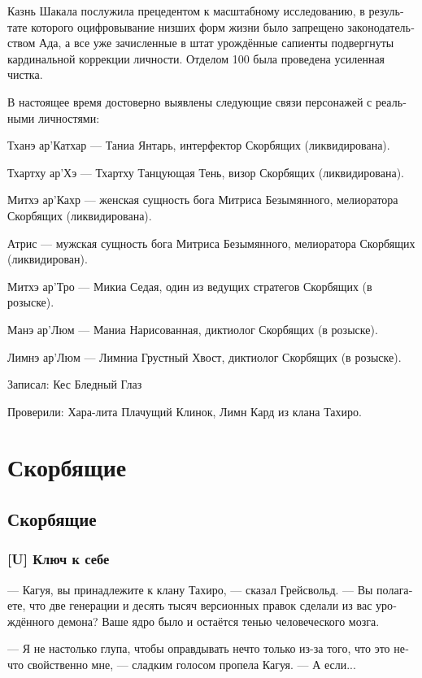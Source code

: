 \documentclass[a4paper,12pt,fleqn]{book}\usepackage{cooltooltips}\usepackage{polyglossia}\setdefaultlanguage[babelshorthands=true]{russian}\setotherlanguage{english}\defaultfontfeatures{Ligatures=TeX,Mapping=tex-text} \usepackage{xcolor}\definecolor{lightgray}{HTML}{bbbbbb}\color{lightgray}\newcommand{\ml}[3]{\textenglish{\textcolor{black}{#3}}}
\newcommand{\textspace}{\vspace{1em}{\centering\Large\bfseries<...>\par}\vspace{1em}}
\begin{document}
Казнь Шакала послужила прецедентом к масштабному исследованию, в результате которого оцифровывание низших форм жизни было запрещено законодательством Ада, а все уже зачисленные в штат урождённые сапиенты подвергнуты кардинальной коррекции личности.
Отделом 100 была проведена усиленная чистка.

В настоящее время достоверно выявлены следующие связи персонажей с реальными личностями:

Тханэ ар'Катхар --- Таниа Янтарь, интерфектор Скорбящих (ликвидирована).

Тхартху ар'Хэ --- Тхартху Танцующая Тень, визор Скорбящих (ликвидирована).

Митхэ ар'Кахр --- женская сущность бога Митриса Безымянного, мелиоратора Скорбящих (ликвидирована).

Атрис --- мужская сущность бога Митриса Безымянного, мелиоратора Скорбящих (ликвидирован).

Митхэ ар'Тро --- Микиа Седая, один из ведущих стратегов Скорбящих (в розыске).

Манэ ар'Люм --- Маниа Нарисованная, диктиолог Скорбящих (в розыске).

Лимнэ ар'Люм --- Лимниа Грустный Хвост, диктиолог Скорбящих (в розыске).

Записал: Кес Бледный Глаз

Проверили: Хара-лита Плачущий Клинок, Лимн Кард из клана Тахиро.

\part{Скорбящие}

\chapter{Скорбящие}

\section{[U] Ключ к себе}

\textspace

--- Кагуя, вы принадлежите к клану Тахиро, --- сказал Грейсвольд.
--- Вы полагаете, что две генерации и десять тысяч версионных правок сделали из вас урождённого демона?
Ваше ядро было и остаётся тенью человеческого мозга.

--- Я не настолько глупа, чтобы оправдывать нечто только из-за того, что это нечто свойственно мне, --- сладким голосом пропела Кагуя.
--- А если...
\end{document}
